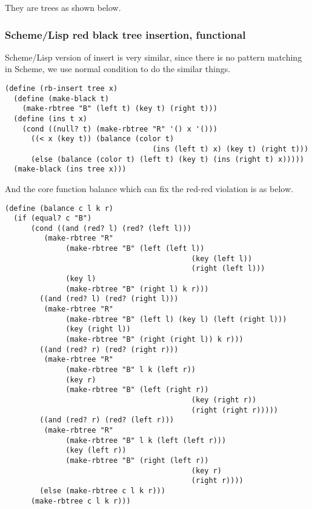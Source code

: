 \documentclass{article}
\begin{document}
They are trees as shown below.


\subsubsection*{Scheme/Lisp red black tree insertion, functional}

Scheme/Lisp version of insert is very similar, since there is no pattern matching
in Scheme, we use normal condition to do the similar things.

\lstset{language=Lisp}
\begin{lstlisting}
(define (rb-insert tree x)
  (define (make-black t)
    (make-rbtree "B" (left t) (key t) (right t)))
  (define (ins t x)
    (cond ((null? t) (make-rbtree "R" '() x '()))
	  ((< x (key t)) (balance (color t) 
                                  (ins (left t) x) (key t) (right t)))
	  (else (balance (color t) (left t) (key t) (ins (right t) x)))))
  (make-black (ins tree x)))
\end{lstlisting}

And the core function balance which can fix the red-red violation is as below.

\begin{lstlisting}
(define (balance c l k r)
  (if (equal? c "B")
      (cond ((and (red? l) (red? (left l)))
	     (make-rbtree "R" 
			  (make-rbtree "B" (left (left l)) 
                                           (key (left l)) 
                                           (right (left l)))
			  (key l)
			  (make-rbtree "B" (right l) k r)))
	    ((and (red? l) (red? (right l)))
	     (make-rbtree "R"
			  (make-rbtree "B" (left l) (key l) (left (right l)))
			  (key (right l))
			  (make-rbtree "B" (right (right l)) k r)))
	    ((and (red? r) (red? (right r)))
	     (make-rbtree "R" 
			  (make-rbtree "B" l k (left r))
			  (key r)
			  (make-rbtree "B" (left (right r)) 
                                           (key (right r)) 
                                           (right (right r)))))
	    ((and (red? r) (red? (left r)))
	     (make-rbtree "R"
			  (make-rbtree "B" l k (left (left r)))
			  (key (left r))
			  (make-rbtree "B" (right (left r)) 
                                           (key r) 
                                           (right r))))
	    (else (make-rbtree c l k r)))
      (make-rbtree c l k r)))
\end{lstlisting}
\end{document}
